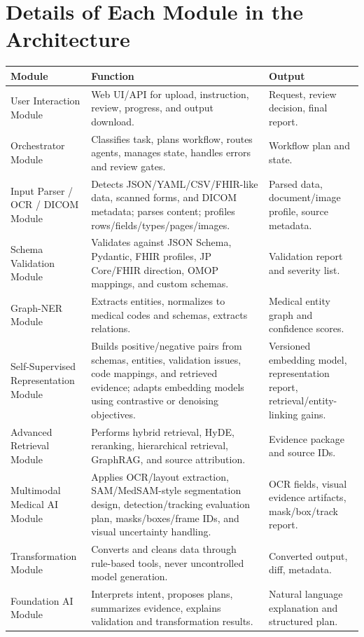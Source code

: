 \documentclass[11pt,a4paper]{article}
\begin{document}
\section{Details of Each Module in the Architecture}

\begin{longtable}{p{}p{}p{}}
\toprule
\textbf{Module} & \textbf{Function} & \textbf{Output} \\
\midrule
User Interaction Module & Web UI/API for upload, instruction, review, progress, and output download. & Request, review decision, final report. \\
Orchestrator Module & Classifies task, plans workflow, routes agents, manages state, handles errors and review gates. & Workflow plan and state. \\
Input Parser / OCR / DICOM Module & Detects JSON/YAML/CSV/FHIR-like data, scanned forms, and DICOM metadata; parses content; profiles rows/fields/types/pages/images. & Parsed data, document/image profile, source metadata. \\
Schema Validation Module & Validates against JSON Schema, Pydantic, FHIR profiles, JP Core/FHIR direction, OMOP mappings, and custom schemas. & Validation report and severity list. \\
Graph-NER Module & Extracts entities, normalizes to medical codes and schemas, extracts relations. & Medical entity graph and confidence scores. \\
Self-Supervised Representation Module & Builds positive/negative pairs from schemas, entities, validation issues, code mappings, and retrieved evidence; adapts embedding models using contrastive or denoising objectives. & Versioned embedding model, representation report, retrieval/entity-linking gains. \\
Advanced Retrieval Module & Performs hybrid retrieval, HyDE, reranking, hierarchical retrieval, GraphRAG, and source attribution. & Evidence package and source IDs. \\
Multimodal Medical AI Module & Applies OCR/layout extraction, SAM/MedSAM-style segmentation design, detection/tracking evaluation plan, masks/boxes/frame IDs, and visual uncertainty handling. & OCR fields, visual evidence artifacts, mask/box/track report. \\
Transformation Module & Converts and cleans data through rule-based tools, never uncontrolled model generation. & Converted output, diff, metadata. \\
Foundation AI Module & Interprets intent, proposes plans, summarizes evidence, explains validation and transformation results. & Natural language explanation and structured plan. \\

\end{longtable}
\end{document}
